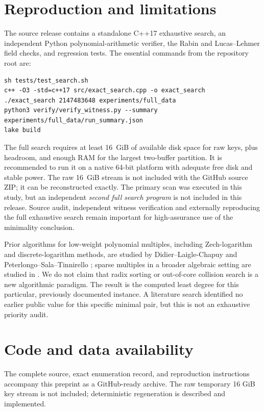 \documentclass[11pt,a4paper]{article}
\begin{document}
\section{Reproduction and limitations}
The source release contains a standalone C++17 exhaustive search, an
independent Python polynomial-arithmetic verifier, the Rabin and
Lucas--Lehmer field checks, and regression tests. The essential commands
from the repository root are:
\begin{lstlisting}
sh tests/test_search.sh
c++ -O3 -std=c++17 src/exact_search.cpp -o exact_search
./exact_search 2147483648 experiments/full_data
python3 verify/verify_witness.py --summary experiments/full_data/run_summary.json
lake build
\end{lstlisting}
The full search requires at least 16~GiB of available disk space for
raw keys, plus headroom, and enough RAM for the largest two-buffer
partition. It is recommended to run it on a native 64-bit platform
with adequate free disk and stable power. The raw 16~GiB stream is not
included with the GitHub source ZIP; it can be reconstructed exactly.
The primary scan was executed in this study, but an independent
\emph{second full search program} is not included in this release.
Source audit, independent witness verification and externally
reproducing the full exhaustive search remain important for
high-assurance use of the minimality conclusion.

Prior algorithms for low-weight polynomial multiples, including
Zech-logarithm and discrete-logarithm methods, are studied by
Didier--Laigle-Chapuy \cite{didier} and
Peterlongo--Sala--Tinnirello \cite{peterlongo}; sparse multiples
in a broader algebraic setting are studied in \cite{giesbrecht}.
We do not claim that radix sorting or out-of-core collision
search is a new algorithmic paradigm. The result is the computed
least degree for this particular, previously documented instance.
A literature search identified no earlier public value for this
specific minimal pair, but this is not an exhaustive priority audit.

\section*{Code and data availability}
The complete source, exact enumeration record, and reproduction
instructions accompany this preprint as a GitHub-ready archive. The raw
temporary 16 GiB key stream is not included; deterministic regeneration
is described and implemented.\par
\end{document}
